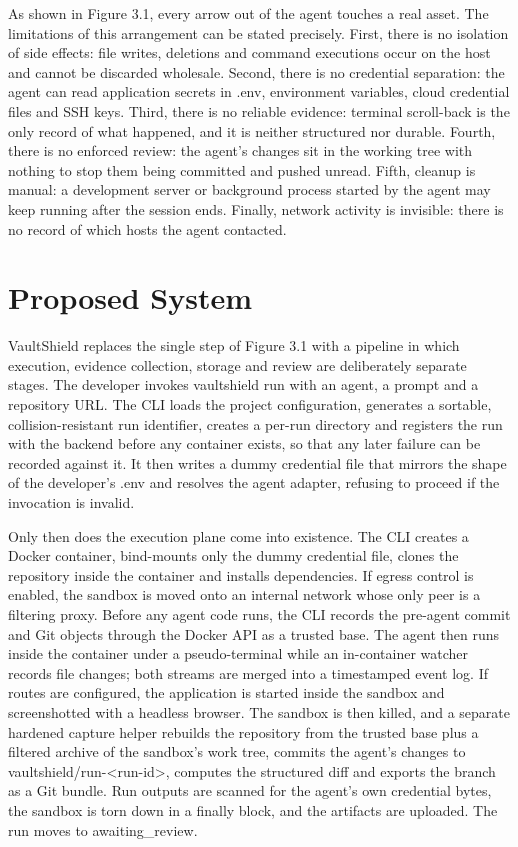 \documentclass[12pt,a4paper,oneside]{report}
\begin{document}
As shown in Figure 3.1, every arrow out of the agent touches a real asset. The limitations of this arrangement can be stated precisely. First, there is no isolation of side effects: file writes, deletions and command executions occur on the host and cannot be discarded wholesale. Second, there is no credential separation: the agent can read application secrets in .env, environment variables, cloud credential files and SSH keys. Third, there is no reliable evidence: terminal scroll-back is the only record of what happened, and it is neither structured nor durable. Fourth, there is no enforced review: the agent's changes sit in the working tree with nothing to stop them being committed and pushed unread. Fifth, cleanup is manual: a development server or background process started by the agent may keep running after the session ends. Finally, network activity is invisible: there is no record of which hosts the agent contacted.

\section{Proposed System}\label{proposed-system}

VaultShield replaces the single step of Figure 3.1 with a pipeline in which execution, evidence collection, storage and review are deliberately separate stages. The developer invokes vaultshield run with an agent, a prompt and a repository URL. The CLI loads the project configuration, generates a sortable, collision-resistant run identifier, creates a per-run directory and registers the run with the backend before any container exists, so that any later failure can be recorded against it. It then writes a dummy credential file that mirrors the shape of the developer's .env and resolves the agent adapter, refusing to proceed if the invocation is invalid.

Only then does the execution plane come into existence. The CLI creates a Docker container, bind-mounts only the dummy credential file, clones the repository inside the container and installs dependencies. If egress control is enabled, the sandbox is moved onto an internal network whose only peer is a filtering proxy. Before any agent code runs, the CLI records the pre-agent commit and Git objects through the Docker API as a trusted base. The agent then runs inside the container under a pseudo-terminal while an in-container watcher records file changes; both streams are merged into a timestamped event log. If routes are configured, the application is started inside the sandbox and screenshotted with a headless browser. The sandbox is then killed, and a separate hardened capture helper rebuilds the repository from the trusted base plus a filtered archive of the sandbox's work tree, commits the agent's changes to vaultshield/run-<run-id>, computes the structured diff and exports the branch as a Git bundle. Run outputs are scanned for the agent's own credential bytes, the sandbox is torn down in a finally block, and the artifacts are uploaded. The run moves to awaiting\_\allowbreak{}review.
\end{document}

